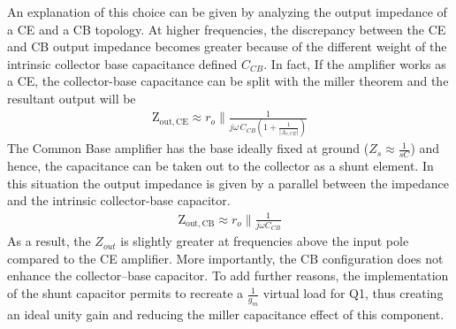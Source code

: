 An explanation of this choice can be given by analyzing the output impedance of a CE and a CB topology.
At higher frequencies, the discrepancy between the CE and CB output impedance becomes greater because of the different weight of the intrinsic collector base capacitance defined $C_{CB}$. In fact, If the amplifier works as a CE, the collector-base capacitance can be split with the miller theorem and the resultant output will be
\begin{align}
    \mathrm{Z}_\mathrm{out,CE}\approx r_o \parallel \frac{1}{j\omega\,C_{CB}\left(1+\frac{1}{|A_{v,CE}|}\right)}
\end{align}
The Common Base amplifier has the base ideally fixed at ground ($Z_s\approx \frac{1}{sC}$) and hence, the capacitance can be taken out to the collector as a shunt element. In this situation the output impedance is given by a parallel between the impedance and the intrinsic collector-base capacitor.
\begin{align}
    \mathrm{Z}_\mathrm{out,CB}\approx r_o \parallel \frac{1}{j\omega C_{CB}}
    \label{eq:ZoutCB}
\end{align}
As a result, the $Z_{out}$ is slightly greater at frequencies above the input pole compared to the CE amplifier. More importantly, the CB configuration does not enhance the collector–base capacitor.
To add further reasons, the implementation of the shunt capacitor permits to recreate a $\frac{1}{g_m}$ virtual load for Q1, thus creating an ideal unity gain and reducing the miller capacitance effect of this component.

